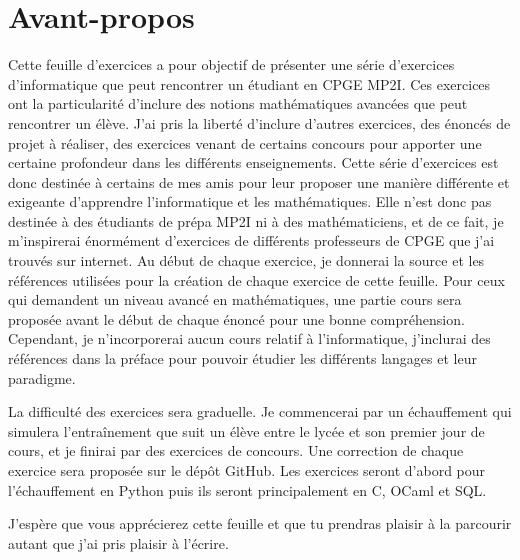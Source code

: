 \section{Avant-propos}
\label{subsec:avant-propos}


Cette feuille d'exercices a pour objectif de présenter une série d'exercices d'informatique que peut rencontrer un étudiant en CPGE MP2I.
Ces exercices ont la particularité d'inclure des notions mathématiques avancées que peut rencontrer un élève.
J'ai pris la liberté d'inclure d'autres exercices, des énoncés de projet à réaliser, des exercices venant de certains concours pour apporter
une certaine profondeur dans les différents enseignements.
Cette série d'exercices est donc destinée à certains de mes amis pour leur proposer une manière différente et exigeante d'apprendre l'informatique
et les mathématiques. Elle n'est donc pas destinée à des étudiants de prépa MP2I ni à des mathématiciens, et de ce fait, je m'inspirerai énormément
d'exercices de différents professeurs de CPGE que j'ai trouvés sur internet. Au début de chaque exercice, je donnerai la source et les références
utilisées pour la création de chaque exercice de cette feuille. Pour ceux qui demandent un niveau avancé en mathématiques, une partie cours sera proposée
avant le début de chaque énoncé pour une bonne compréhension. Cependant, je n'incorporerai aucun cours relatif à l'informatique, j'inclurai des
références dans la préface pour pouvoir étudier les différents langages et leur paradigme.

La difficulté des exercices sera graduelle. Je commencerai par un échauffement qui simulera l'entraînement que suit un élève entre le lycée et
son premier jour de cours, et je finirai par des exercices de concours. Une correction de chaque exercice sera proposée sur le dépôt GitHub.
Les exercices seront d'abord pour l'échauffement en Python puis ils seront principalement en C, OCaml et SQL.

J'espère que vous apprécierez cette feuille et que tu prendras plaisir à la parcourir autant que j'ai pris plaisir à l'écrire.